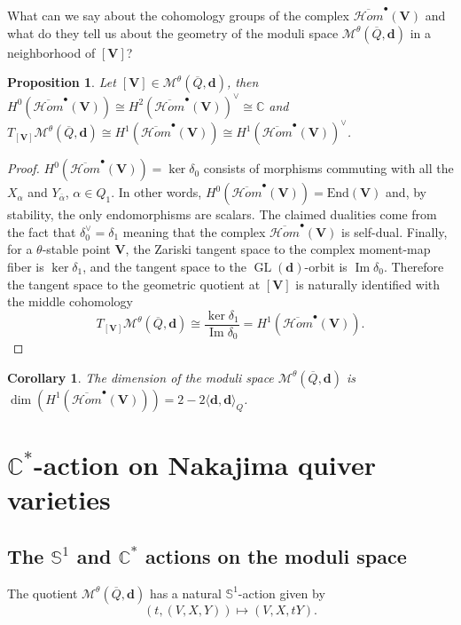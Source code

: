 \documentclass{amsart}
\theoremstyle{plain}
\newtheorem{corollary}[theorem]{Corollary}
\newtheorem{proposition}[theorem]{Proposition}
\numberwithin{equation}{section}
\theoremstyle{definition}
\theoremstyle{remark}
\begin{document}
	What can we say about the cohomology groups of the complex $\overline{\mathcal{H}om}^\bullet(\mathbf{V})$ and what do they tell us about the geometry of the moduli space $\mathcal{M}^{\theta}(\overline{Q},\mathbf{d})$ in a neighborhood of $[\mathbf{V}]$? 
	\begin{proposition}\label{cohomologiesDeformationComplexNakajimaQuiverVarieties}
	Let $[\mathbf{V}]\in \mathcal{M}^{\theta}(\overline{Q},\mathbf{d})$, then $H^0(\overline{\mathcal{H}om}^\bullet(\mathbf{V}))\cong H^2(\overline{\mathcal{H}om}^\bullet(\mathbf{V}))^\vee\cong\mathbb{C}$ and $T_{[\mathbf{V}]}\mathcal{M}^{\theta}(\overline{Q},\mathbf{d})\cong H^1(\overline{\mathcal{H}om}^\bullet(\mathbf{V}))\cong H^1(\overline{\mathcal{H}om}^\bullet(\mathbf{V}))^\vee$.
	\end{proposition}
	\begin{proof}
		$H^0(\overline{\mathcal{H}om}^\bullet(\mathbf{V}))=\ker \delta_0$ consists of morphisms commuting with all the $X_\alpha$ and $Y_{\overline{\alpha}}$, $\alpha\in Q_1$. In other words, $H^0(\overline{\mathcal{H}om}^\bullet(\mathbf{V}))=\text{End}(\mathbf{V})$ and, by stability, the only endomorphisms are scalars. The claimed dualities come from the fact that $\delta_0^\vee=\delta_1$ meaning that the complex $\overline{\mathcal{H}om}^\bullet(\mathbf{V})$ is self-dual. Finally, for a $\theta$-stable point $\mathbf V$, the Zariski tangent space to the complex moment-map fiber is $\ker \delta_1$, and the tangent space to the $\operatorname{GL}(\mathbf d)$-orbit is $\operatorname{Im}\delta_0$. Therefore the tangent space to the geometric quotient at $[\mathbf V]$ is naturally identified with the middle cohomology
		\[
		T_{[\mathbf V]}\mathcal M^\theta(\overline Q,\mathbf d)
		\cong
		\frac{\ker\delta_1}{\operatorname{Im}\delta_0}
		=
		H^1(\overline{\mathcal H om}^\bullet(\mathbf V)).
		\]
	\end{proof}
	\begin{corollary}
	The dimension of the moduli space $\mathcal{M}^{\theta}(\overline{Q},\mathbf{d})$ is $\dim(H^1(\overline{\mathcal{H}om}^\bullet(\mathbf{V})))=2-2\langle\mathbf{d},\mathbf{d}\rangle_Q$.
	\end{corollary}
	\section{$\mathbb{C}^*$-action on Nakajima quiver varieties}\label{torusActionSection}
	\subsection{The $\mathbb{S}^1$ and $\mathbb{C}^*$ actions on the moduli space} The quotient $\mathcal{M}^{\theta}(\overline{Q},\mathbf{d})$ has a natural $\mathbb{S}^1$-action given by
	$$
	(t,(V,X,Y))\mapsto (V,X,tY).
	$$  
	
\end{document}
